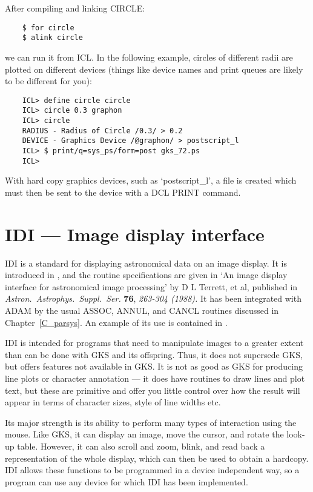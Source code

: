 After compiling and linking CIRCLE:

\begin{small}
\begin{verbatim}
    $ for circle
    $ alink circle
\end{verbatim}
\end{small}

we can run it from ICL.
In the following example, circles of different radii are plotted on different
devices (things like device names and print queues are likely to be different
for you):

\begin{small}
\begin{verbatim}
    ICL> define circle circle
    ICL> circle 0.3 graphon
    ICL> circle
    RADIUS - Radius of Circle /0.3/ > 0.2
    DEVICE - Graphics Device /@graphon/ > postscript_l
    ICL> $ print/q=sys_ps/form=post gks_72.ps
    ICL>
\end{verbatim}
\end{small}

With hard copy graphics devices, such as `postscript\_l', a file is created
which must then be sent to the device with a DCL PRINT command.

\section{IDI --- Image display interface}

IDI is a standard for displaying astronomical data on an image display.
It is introduced in , and the routine specifications are
given in
`An image display interface for astronomical image processing' by D L Terrett,
et al, published in {\em Astron.\ Astrophys.\ Suppl.\ Ser.} {\bf 76},
{\em 263-304 (1988).}
It has been integrated with ADAM by the usual ASSOC, ANNUL, and CANCL routines
discussed in Chapter~\ref{C_parsys}.
An example of its use is contained in .

IDI is intended for programs that need to manipulate images to a greater extent
than can be done with GKS and its offspring.
Thus, it does not supersede GKS, but offers features not available in GKS.
It is not as good as GKS for producing line plots or character annotation ---
it does have routines to draw lines and plot text, but these are primitive and
offer you little control over how the result will appear in terms of character
sizes, style of line widths etc.

Its major strength is its ability to perform many types of interaction using the
mouse.
Like GKS, it can display an image, move the cursor, and rotate the look-up
table.
However, it can also scroll and zoom, blink, and read back a representation of
the whole display, which can then be used to obtain a hardcopy.
IDI allows these functions to be programmed in a device independent way, so
a program can use any device for which IDI has been implemented.

